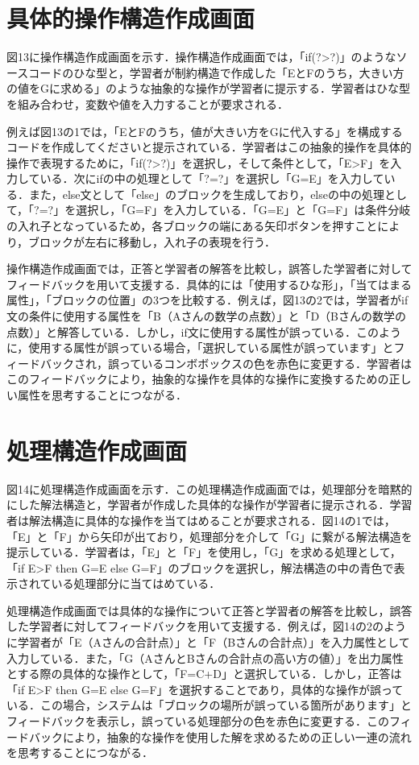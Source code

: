 \newpage


\section{具体的操作構造作成画面}
図13に操作構造作成画面を示す．操作構造作成画面では，「if(?>?)」のようなソースコードのひな型と，学習者が制約構造で作成した「EとFのうち，大きい方の値をGに求める」のような抽象的な操作が学習者に提示する．学習者はひな型を組み合わせ，変数や値を入力することが要求される．

例えば図13の1では，「EとFのうち，値が大きい方をGに代入する」を構成するコードを作成してくださいと提示されている．学習者はこの抽象的操作を具体的操作で表現するために，「if(?>?)」を選択し，そして条件として，「E>F」を入力している．次にifの中の処理として「?=?」を選択し「G=E」を入力している．また，else文として「else」のブロックを生成しており，elseの中の処理として，「?=?」を選択し，「G=F」を入力している．「G=E」と「G=F」は条件分岐の入れ子となっているため，各ブロックの端にある矢印ボタンを押すことにより，ブロックが左右に移動し，入れ子の表現を行う．

操作構造作成画面では，正答と学習者の解答を比較し，誤答した学習者に対してフィードバックを用いて支援する．具体的には「使用するひな形」，「当てはまる属性」，「ブロックの位置」の3つを比較する．例えば，図13の2では，学習者がif文の条件に使用する属性を「B（Aさんの数学の点数）」と「D（Bさんの数学の点数）」と解答している．しかし，if文に使用する属性が誤っている．このように，使用する属性が誤っている場合，「選択している属性が誤っています」とフィードバックされ，誤っているコンボボックスの色を赤色に変更する．学習者はこのフィードバックにより，抽象的な操作を具体的な操作に変換するための正しい属性を思考することにつながる．


\newpage


\section{処理構造作成画面}
図14に処理構造作成画面を示す．この処理構造作成画面では，処理部分を暗黙的にした解法構造と，学習者が作成した具体的な操作が学習者に提示される．学習者は解法構造に具体的な操作を当てはめることが要求される．図14の1では，「E」と「F」から矢印が出ており，処理部分を介して「G」に繋がる解法構造を提示している．学習者は，「E」と「F」を使用し，「G」を求める処理として，「if E>F then G=E else G=F」のブロックを選択し，解法構造の中の青色で表示されている処理部分に当てはめている．

処理構造作成画面では具体的な操作について正答と学習者の解答を比較し，誤答した学習者に対してフィードバックを用いて支援する．例えば，図14の2のように学習者が「E（Aさんの合計点）」と「F（Bさんの合計点）」を入力属性として入力している．また，「G（AさんとBさんの合計点の高い方の値）」を出力属性とする際の具体的な操作として，「F=C+D」と選択している．しかし，正答は「if E>F then G=E else G=F」を選択することであり，具体的な操作が誤っている．この場合，システムは「ブロックの場所が誤っている箇所があります」とフィードバックを表示し，誤っている処理部分の色を赤色に変更する．このフィードバックにより，抽象的な操作を使用した解を求めるための正しい一連の流れを思考することにつながる．
